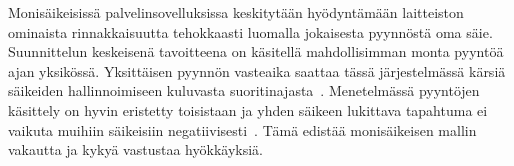 \documentclass[12pt]{article}
\begin{document}
Monisäikeisissä palvelinsovelluksissa keskitytään hyödyntämään laitteiston ominaista
rinnakkaisuutta tehokkaasti luomalla jokaisesta pyynnöstä oma säie. Suunnittelun keskeisenä
tavoitteena on käsitellä mahdollisimman monta pyyntöä ajan yksikössä. Yksittäisen pyynnön
vasteaika saattaa tässä
järjestelmässä kärsiä säikeiden hallinnoimiseen kuluvasta suoritinajasta~\cite{easton_developing_2004}.
Menetelmässä pyyntöjen käsittely on hyvin eristetty toisistaan ja
yhden säikeen lukittava tapahtuma ei vaikuta muihiin säikeisiin negatiivisesti~\cite{davis_case_2017}.
Tämä edistää monisäikeisen mallin vakautta ja kykyä vastustaa hyökkäyksiä.




\end{document}
